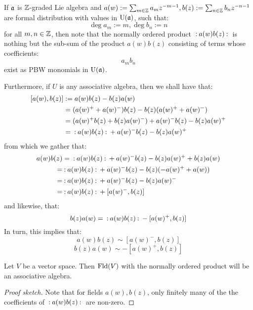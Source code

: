         \begin{remark}
            If $\mathfrak{a}$ is  $\mathbb{Z}$-graded Lie algebra and $a(w) := \sum_{m \in \mathbb{Z}} a_m z^{-m - 1}, b(z) := \sum_{n \in \mathbb{Z}} b_n z^{-n - 1}$ are formal distribution with values in $\mathrm{U}(\mathfrak{a})$, such that:
                $$\deg a_m := m, \deg b_n := n$$
            for all $m, n \in \mathbb{Z}$, then note that the normally ordered product $\: \mathbf{:} \: { a(w) b(z) }  \: \mathbf{:} \:$ is nothing but the sub-sum of the  product $a(w) b(z)$ consisting of terms whose coefficients:
                $$a_m b_n$$
            exist as PBW monomials in $\mathrm{U}(\mathfrak{a})$.

            Furthermore, if $U$ is any associative algebra, then we shall have that:
                $$
                    \begin{aligned}
                        [a(w), b(z)] & := a(w) b(z) - b(z) a(w)
                        \\
                        & = ( a(w)^+ + a(w)^- ) b(z) - b(z) ( a(w)^+ + a(w)^- )
                        \\
                        & = ( a(w)^+ b(z) + b(z) a(w)^- ) + a(w)^- b(z) - b(z) a(w)^+
                        \\
                        & = \order{ a(w) b(z) } + a(w)^- b(z) - b(z) a(w)^+
                    \end{aligned}
                $$
            from which we gather that:
                $$
                    \begin{aligned}
                        a(w) b(z) & = \: \mathbf{:} \: { a(w) b(z) }  \: \mathbf{:} \: + a(w)^- b(z) - b(z) a(w)^+ + b(z) a(w)
                        \\
                        = & \: \mathbf{:} \: { a(w) b(z) }  \: \mathbf{:} \: + a(w)^- b(z) - b(z) ( -a(w)^+ + a(w) )
                        \\
                        = & \: \mathbf{:} \: { a(w) b(z) }  \: \mathbf{:} \: + a(w)^- b(z) - b(z) a(w)^-
                        \\
                        = & \: \mathbf{:} \: { a(w) b(z) }  \: \mathbf{:} \: + [ a(w)^-, b(z) ]
                    \end{aligned}
                $$
            and likewise, that:
                $$
                    b(z) a(w) = \: \mathbf{:} \: { a(w) b(z) }  \: \mathbf{:} \: - [ a(w)^+, b(z) ]
                $$
            In turn, this implies that:
                \begin{equation} \label{equation: OPEs}
                    a(w) b(z) \sim [ a(w)^-, b(z) ]
                \end{equation}
                $$b(z) a(w) \sim -[ a(w)^+, b(z) ]$$
        \end{remark}
        \begin{lemma} \label{lemma: normally_ordered_products_of_fields}
            Let $V$ be a vector space. Then $\mathrm{Fld}(V)$ with the normally ordered product will be an associative algebra.
        \end{lemma}
            \begin{proof}[Proof sketch]
                Note that for fields $a(w), b(z)$, only finitely many of the the coefficients of $\: \mathbf{:} \: { a(w) b(z) }  \: \mathbf{:} \:$ are non-zero.
            \end{proof}


